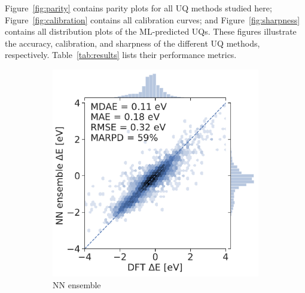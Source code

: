 \documentclass[]{achemso}
\begin{document}
Figure~\ref{fig:parity} contains parity plots for all \gls{UQ} methods studied here; Figure~\ref{fig:calibration} contains all calibration curves; and Figure~\ref{fig:sharpness} contains all distribution plots of the \gls{ML}-predicted \gls{UQ}s.
These figures illustrate the accuracy, calibration, and sharpness of the different \gls{UQ} methods, respectively.
Table~\ref{tab:results} lists their performance metrics.

\begin{figure}
    \centering
    \begin{subfigure}{0.32\textwidth}
        \includegraphics[width=\textwidth]{../NN_ensemble/parity.pdf}
        \caption{\gls{NN} ensemble}\label{fig:parity_ensemble}
    \end{subfigure}
    \begin{subfigure}{0.32\textwidth}

\end{subfigure}
\end{figure}
\end{document}
